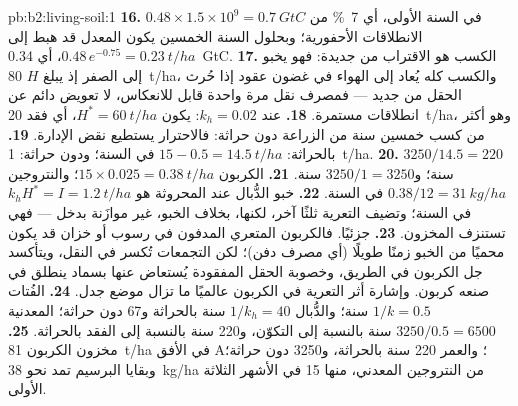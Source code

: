 \begin{solution}{pb:b2:living-soil:1}
\textbf{16.} $0.48\times 1.5\times 10^{9} = \qty{0.7}{GtC}$ في السنة
الأولى، أي \qty{7}{\%} من الانطلاقات الأحفورية؛ وبحلول السنة الخمسين
يكون المعدل قد هبط إلى $0.48\,e^{-0.75} = \qty{0.23}{t/ha}$،
أي \qty{0.34}{GtC}.
\textbf{17.} الكسب هو الاقتراب من  جديدة: فهو
يخبو إلى الصفر إذ يبلغ $H$ \qty{80}{t/ha}، والكسب كله
يُعاد إلى الهواء في غضون عقود إذا حُرث الحقل من جديد
--- فمصرف  نقل مرة واحدة قابل للانعكاس، لا تعويض دائم
عن انطلاقات مستمرة.
\textbf{18.} عند $k_h = 0.02$: يكون $H^{*} = \qty{60}{t/ha}$، أي فقد
\qty{20}{t/ha}، وهو أكثر من كسب خمسين سنة من الزراعة دون حراثة:
فالاحترار يستطيع نقض
الإدارة.
\textbf{19.} بالحراثة: $15 - 0.5 = \qty{14.5}{t/ha}$ في السنة؛ ودون حراثة:
\qty{1}{t/ha}.
\textbf{20.} $3250/14.5 = 220$ سنة؛ و$3250/1 = 3250$ سنة.
\textbf{21.} الكربون $15\times 0.025 = \qty{0.38}{t/ha}$؛ والنتروجين
$0.38/12 = \qty{31}{kg/ha}$ في السنة.
\textbf{22.} خبو الدُّبال عند  المحروثة هو $k_hH^{*} =
I = \qty{1.2}{t/ha}$ في السنة؛ وتضيف التعرية ثلثًا آخر،
لكنها، بخلاف الخبو، غير موازَنة بدخل --- فهي تستنزف
المخزون.
\textbf{23.} جزئيًا. فالكربون المتعري المدفون في رسوب أو
خزان قد يكون محميًا من الخبو زمنًا طويلًا (أي مصرف
دفن)؛ لكن التجمعات تُكسر في النقل، ويتأكسد جل
الكربون في الطريق، وخصوبة الحقل المفقودة
يُستعاض عنها بسماد ينطلق في صنعه كربون. وإشارة
أثر التعرية في الكربون عالميًا ما تزال موضع جدل.
\textbf{24.} الفُتات $1/k = 0.5$ سنة؛ والدُّبال $1/k_h = 40$ سنة
بالحراثة و67 دون حراثة؛  المعدنية $3250/0.5 =
6500$ سنة بالنسبة إلى التكوّن، و220 سنة بالنسبة
إلى الفقد بالحراثة.
\textbf{25.} مخزون الكربون \qty{81}{t/ha} في الأفق A؛ والعمر
220 سنة بالحراثة، و3250 دون حراثة؛ وبقايا البرسيم
تمد نحو \qty{38}{kg/ha} من النتروجين المعدني، منها 15 في
الأشهر الثلاثة الأولى.
\end{solution}
